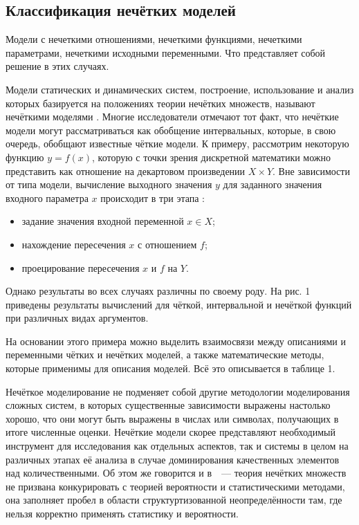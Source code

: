 \subsection{Классификация нечётких моделей}


Модели с нечеткими отношениями, нечеткими функциями, нечеткими параметрами, нечеткими исходными переменными. Что представляет собой решение в этих случаях.

Модели статических и динамических систем, построение, использование и анализ которых базируется на положениях теории нечётких множеств, называют нечёткими моделями \cite{Borisov_Fedulov}. Многие исследователи отмечают тот факт, что нечёткие модели могут рассматриваться как обобщение интервальных, которые, в свою очередь, обобщают известные чёткие модели. К примеру, рассмотрим некоторую функцию $y=f \left(x \right)$, которую с точки зрения дискретной математики можно представить как отношение на декартовом произведении $X \times Y$. Вне зависимости от типа модели, вычисление выходного значения $y$ для заданного значения входного параметра $x$ происходит в три этапа \cite{Borisov_Fedulov}:
\begin{itemize}
	\item задание значения входной переменной $x \in X$;
	\item нахождение пересечения $x$ с отношением $f$;
	\item проецирование пересечения $x$ и $f$ на $Y$.
\end{itemize}

Однако результаты во всех случаях различны по своему роду. На рис. 1 приведены результаты вычислений для чёткой, интервальной и нечёткой функций при различных видах аргументов. 

На основании этого примера можно выделить взаимосвязи между описаниями и переменными чётких и нечётких моделей, а также математические методы, которые применимы для описания моделей. Всё это описывается в таблице 1.

Нечёткое моделирование не подменяет собой другие методологии моделирования сложных систем, в которых существенные зависимости выражены настолько хорошо, что они могут быть выражены в числах или символах, получающих в итоге численные оценки. Нечёткие модели скорее представляют необходимый инструмент для исследования как отдельных аспектов, так и системы в целом на различных этапах её анализа в случае доминирования качественных элементов над количественными. Об этом же говорится и в~\cite{Kaufmann}~--- теория нечётких множеств не призвана конкурировать с теорией вероятности и статистическими методами, она заполняет пробел в области структуртизованной неопределённости там, где нельзя корректно применять статистику и вероятности.

